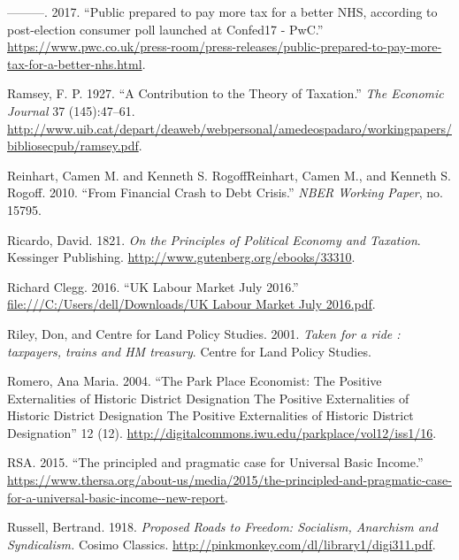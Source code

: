 \documentclass[]{tufte-handout}
\begin{document}
\leavevmode\hypertarget{ref-PWC2017}{}%
---------. 2017. ``Public prepared to pay more tax for a better NHS,
according to post-election consumer poll launched at Confed17 - PwC.''
\url{https://www.pwc.co.uk/press-room/press-releases/public-prepared-to-pay-more-tax-for-a-better-nhs.html}.

\leavevmode\hypertarget{ref-Ramsey1927}{}%
Ramsey, F. P. 1927. ``A Contribution to the Theory of Taxation.''
\emph{The Economic Journal} 37 (145):47--61.
\url{http://www.uib.cat/depart/deaweb/webpersonal/amedeospadaro/workingpapers/bibliosecpub/ramsey.pdf}.

\leavevmode\hypertarget{ref-ReinhartCamenM.andKennethS.RogoffReinhart2010}{}%
Reinhart, Camen M. and Kenneth S. RogoffReinhart, Camen M., and Kenneth
S. Rogoff. 2010. ``From Financial Crash to Debt Crisis.'' \emph{NBER
Working Paper}, no. 15795.

\leavevmode\hypertarget{ref-ricardo1821principles}{}%
Ricardo, David. 1821. \emph{On the Principles of Political Economy and
Taxation}. Kessinger Publishing.
\url{http://www.gutenberg.org/ebooks/33310}.

\leavevmode\hypertarget{ref-RichardClegg2016}{}%
Richard Clegg. 2016. ``UK Labour Market July 2016.''
\href{file:///C:/Users/dell/Downloads/UK\%20Labour\%20Market\%20July\%202016.pdf}{file:///C:/Users/dell/Downloads/UK Labour Market July 2016.pdf}.

\leavevmode\hypertarget{ref-Riley2001}{}%
Riley, Don, and Centre for Land Policy Studies. 2001. \emph{Taken for a
ride : taxpayers, trains and HM treasury}. Centre for Land Policy
Studies.

\leavevmode\hypertarget{ref-romero2004}{}%
Romero, Ana Maria. 2004. ``The Park Place Economist: The Positive
Externalities of Historic District Designation The Positive
Externalities of Historic District Designation The Positive
Externalities of Historic District Designation'' 12 (12).
\url{http://digitalcommons.iwu.edu/parkplace/vol12/iss1/16}.

\leavevmode\hypertarget{ref-RSA2015}{}%
RSA. 2015. ``The principled and pragmatic case for Universal Basic
Income.''
\url{https://www.thersa.org/about-us/media/2015/the-principled-and-pragmatic-case-for-a-universal-basic-income--new-report}.

\leavevmode\hypertarget{ref-BertrandRussell1918}{}%
Russell, Bertrand. 1918. \emph{Proposed Roads to Freedom: Socialism,
Anarchism and Syndicalism.} Cosimo Classics.
\url{http://pinkmonkey.com/dl/library1/digi311.pdf}.
\end{document}
